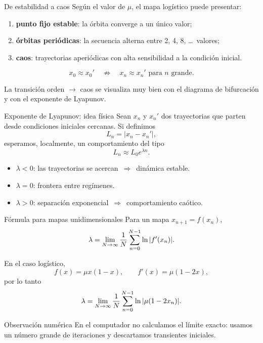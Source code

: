 \begin{frame}{De estabilidad a caos}
Según el valor de $\mu$, el mapa logístico puede presentar:
\begin{enumerate}
    \item \textbf{punto fijo estable}: la órbita converge a un único valor;
    \item \textbf{órbitas periódicas}: la secuencia alterna entre 2, 4, 8, \dots\ valores;
    \item \textbf{caos}: trayectorias aperiódicas con alta sensibilidad a la condición inicial.
\end{enumerate}

\begin{equation*}
    x_0\approx x_0' \quad \not\Rightarrow \quad x_n\approx x_n' \text{ para } n \text{ grande.}
\end{equation*}

La transición orden $\to$ caos se visualiza muy bien con el diagrama de bifurcación y con el exponente de Lyapunov.
\end{frame}

\begin{frame}{Exponente de Lyapunov: idea física}
Sean $x_n$ y $x_n'$ dos trayectorias que parten desde condiciones iniciales cercanas. Si definimos
\begin{equation*}
L_n = |x_n-x_n'|,
\end{equation*}
esperamos, localmente, un comportamiento del tipo
\begin{equation*}
L_n \approx L_0 e^{\lambda n}.
\end{equation*}

\begin{itemize}
    \item $\lambda < 0$: las trayectorias se acercan \,$\Rightarrow$\, dinámica estable.
    \item $\lambda = 0$: frontera entre regímenes.
    \item $\lambda > 0$: separación exponencial \,$\Rightarrow$\, comportamiento caótico.
\end{itemize}
\end{frame}

\begin{frame}{Fórmula para mapas unidimensionales}
Para un mapa $x_{n+1}=f(x_n)$,
\begin{equation*}
    \lambda = \lim_{N\to\infty} \frac{1}{N}\sum_{n=0}^{N-1} \ln\abs{f'(x_n)}.
\end{equation*}

En el caso logístico,
\begin{equation*}
    f(x)=\mu x(1-x),
    \qquad
    f'(x)=\mu(1-2x),
\end{equation*}
por lo tanto
\begin{equation*}
    \lambda = \lim_{N\to\infty} \frac{1}{N}\sum_{n=0}^{N-1} \ln\abs{\mu(1-2x_n)}.
\end{equation*}

\begin{alertblock}{Observación numérica}
En el computador no calculamos el límite exacto: usamos un número grande de iteraciones y descartamos transientes iniciales.
\end{alertblock}
\end{frame}

